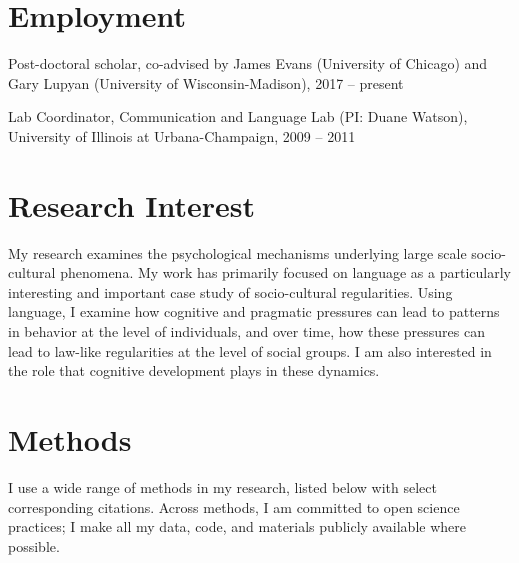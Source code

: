 \documentclass[letterpaper]{article}
\renewenvironment{itemize}{
  \begin{list}{}{
    \setlength{\leftmargin}{1.5em}
  }
}{
  \end{list}
}
\begin{document}
\section*{Employment}

\begin{itemize}
\item Post-doctoral scholar, co-advised by James Evans (University of Chicago) and Gary Lupyan (University of Wisconsin-Madison), 2017 -- present

\item Lab Coordinator, Communication and Language Lab (PI: Duane Watson), University of Illinois at Urbana-Champaign,  2009 -- 2011

\end{itemize}

\section*{Research Interest}


My research examines the psychological mechanisms underlying large scale socio-cultural phenomena. My work has primarily focused on language as a particularly interesting and important case study of socio-cultural regularities. Using language, I examine how cognitive and pragmatic pressures can lead to patterns in behavior at the level of individuals, and over time, how these pressures can lead to law-like regularities at the level of social groups. I am also interested in the role that  cognitive development plays in these dynamics.

\section*{Methods}
I use a wide range of methods in my research, listed below with select corresponding citations. Across methods, I am committed to open science practices; I make all my data, code, and materials publicly available where possible. 
\end{document}
